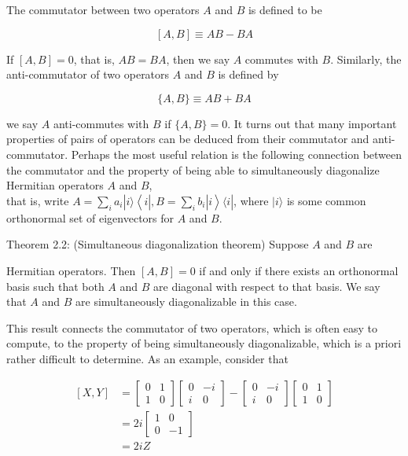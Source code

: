 The commutator between two operators $A$ and $B$ is defined to be

$$
[A, B] \equiv A B-B A
$$

If $[A, B]=0$, that is, $A B=B A$, then we say $A$ commutes with $B$. Similarly, the anti-commutator of two operators $A$ and $B$ is defined by

$$
\{A, B\} \equiv A B+B A
$$

we say $A$ anti-commutes with $B$ if $\{A, B\}=0$. It turns out that many important properties of pairs of operators can be deduced from their commutator and anti-commutator. Perhaps the most useful relation is the following connection between the commutator and the property of being able to simultaneously diagonalize Hermitian operators $A$ and $B$,\\
that is, write $A=\sum_{i} a_{i}|i\rangle\left\langle i\left|, B=\sum_{i} b_{i}\right| i\right\rangle\langle i|$, where $|i\rangle$ is some common orthonormal set of eigenvectors for $A$ and $B$.

Theorem 2.2: (Simultaneous diagonalization theorem) Suppose $A$ and $B$ are

Hermitian operators. Then $[A, B]=0$ if and only if there exists an orthonormal basis such that both $A$ and $B$ are diagonal with respect to that basis. We say that $A$ and $B$ are simultaneously diagonalizable in this case.

This result connects the commutator of two operators, which is often easy to compute, to the property of being simultaneously diagonalizable, which is a priori rather difficult to determine. As an example, consider that

$$
\begin{aligned}
{[X, Y] } & =\left[\begin{array}{ll}
0 & 1 \\
1 & 0
\end{array}\right]\left[\begin{array}{rr}
0 & -i \\
i & 0
\end{array}\right]-\left[\begin{array}{rr}
0 & -i \\
i & 0
\end{array}\right]\left[\begin{array}{ll}
0 & 1 \\
1 & 0
\end{array}\right] \\
& =2 i\left[\begin{array}{rr}
1 & 0 \\
0 & -1
\end{array}\right] \\
& =2 i Z
\end{aligned}
$$

